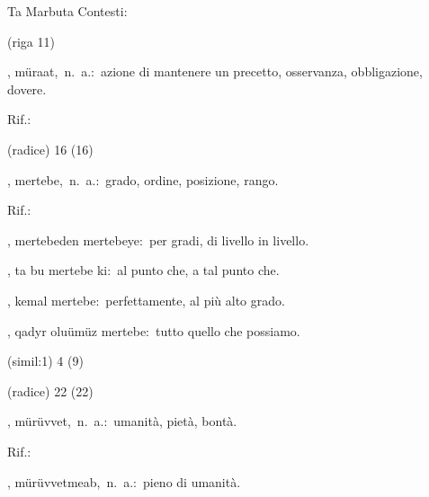\begin{glossario}{Ta Marbuta}
Contesti:
\begin{subvocedue}
\item[(riga 11)] 
\end{subvocedue}
\item[{\color{colorlowref}\spzrl{murA`A_T}},] {\sf müraat},\ n.\ a.:\ azione di mantenere un precetto, osservanza, obbligazione, dovere.
\begin{subvocedue}
\item[Rif.:] 
\end{subvocedue}
\begin{subvocedue}
\item[(radice)]   16 (16)
\end{subvocedue}
\item[{\color{colorlowref}\spzrl{martab:H}},] {\sf mertebe},\ n.\ a.:\ grado, ordine, posizione, rango.
\begin{subvocedue}
\item[Rif.:] 
\end{subvocedue}
\begin{subvocedue}
\item[\subglossariobullet] , {\sf mertebeden mertebeye}:\ per gradi, di livello in livello.
\item[\subglossariobullet] , {\sf ta bu mertebe ki}:\ al punto che, a tal punto che.
\item[\subglossariobullet] , {\sf kemal mertebe}:\ perfettamente, al più alto grado.
\item[\subglossariobullet] , {\sf qadyr olu\textgamma ümüz mertebe}:\ tutto quello che possiamo.
\item[(simil:1)]   4 (9)
\item[(radice)]   22 (22)
\end{subvocedue}
\item[{\color{colorlowref}\spzrl{muruwwa_T}},] {\sf mürüvvet},\ n.\ a.:\ umanità, pietà, bontà.
\begin{subvocedue}
\item[Rif.:] 
\end{subvocedue}
\begin{subvocedue}
\item[\subglossariobullet] , {\sf mürüvvetmeab},\ n.\ a.:\ pieno di umanità.
\begin{subvocedue}

\end{subvocedue}
\end{subvocedue}
\end{glossario}
